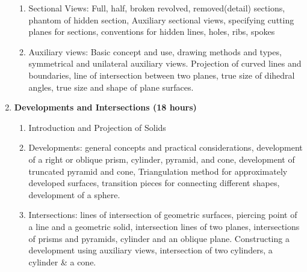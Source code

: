 \begin{enumerate}
\begin{enumerate}
        \item Sectional Views: Full, half, broken revolved, removed(detail) sections, phantom of hidden section, Auxiliary sectional views, specifying cutting planes for sections, conventions for hidden lines, holes, ribs, spokes
        
        \item Auxiliary views: Basic concept and use, drawing methods and types, symmetrical and unilateral auxiliary views. Projection of curved lines and boundaries, line of intersection between two planes, true size of dihedral angles, true size and shape of plane surfaces.
    \end{enumerate}
    
    \item \textbf{Developments and Intersections \hfill (18 hours)}
    \begin{enumerate}
        \item Introduction and Projection of Solids
        \item Developments: general concepts and practical considerations, development of a right or oblique prism, cylinder, pyramid, and cone, development of truncated pyramid and cone, Triangulation method for approximately developed surfaces, transition pieces for connecting different shapes, development of a sphere.
        \item Intersections: lines of intersection of geometric surfaces, piercing point of a line and a geometric solid, intersection lines of two planes, intersections of prisms and pyramids, cylinder and an oblique plane. Constructing a development using auxiliary views, intersection of two cylinders, a cylinder \& a cone.
    \end{enumerate}
\end{enumerate}

